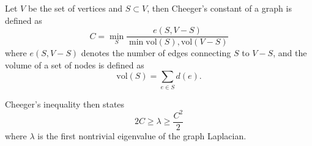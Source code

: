 Let $V$ be the set of vertices and $S\subset V$, then Cheeger's
constant of a graph is defined as
\[ C=\min_S \frac{e(S,V-S)}
        {\min{\mathord{\mathrm{vol}}(S),\mathord{\mathrm{vol}}(V-S)}}
\]
where $e(S,V-S)$ denotes the number of edges connecting $S$ to $V-S$,
and the volume of a set of nodes is defined as
\[ \mathord{\mathrm{vol}}(S) = \sum_{e\in S}d(e). \]

Cheeger's inequality then states
\[ 2C \geq \lambda \geq \frac{C^2}2 \]
where $\lambda$ is the first nontrivial eigenvalue of the graph
Laplacian.
